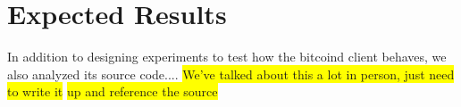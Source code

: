 \section{Expected Results}
In addition to designing experiments to test how the bitcoind client behaves, we also analyzed its source code....
\colorbox{yellow}{We've talked about this a lot in person, just need to write it} \colorbox{yellow}{up and reference the source}

